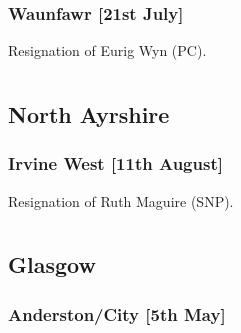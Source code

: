 \documentclass[a4paper,openany]{book}
\begin{document}
\begin{resultsiii}
\subsubsection*{Waunfawr \hspace*{\fill}\nolinebreak[1]%
\enspace\hspace*{\fill}
[21st July]}


Resignation of Eurig Wyn (PC).

\section[Ayrshire Councils]{}

\subsection*{North Ayrshire}

\subsubsection*{Irvine West \hspace*{\fill}\nolinebreak[1]%
\enspace\hspace*{\fill}
[11th August]}


Resignation of Ruth Maguire (SNP).

\section[Clyde Councils]{}

\subsection*{Glasgow}

\subsubsection*{Anderston/City \hspace*{\fill}\nolinebreak[1]%
\enspace\hspace*{\fill}
[5th May]}



\end{resultsiii}
\end{document}
